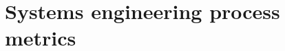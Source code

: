 %
\thispagestyle{fancy}
\chapter{Systems engineering process metrics}
\label{chp:sys_eng_process_metrics}
